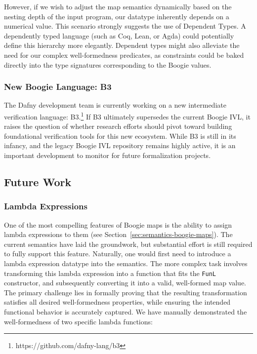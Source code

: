 \documentclass[11pt]{article}
\begin{document}
However, if we wish to adjust the map semantics dynamically based on the nesting depth of the input program,
our datatype inherently depends on a numerical value.
This scenario strongly suggests the use of Dependent Types. %
A dependently typed language (such as Coq, Lean, or Agda) could potentially define this hierarchy more elegantly.
Dependent types might also alleviate the need for our complex well-formedness predicates,
as constraints could be baked directly into the type signatures corresponding to the Boogie values.



\subsubsection{New Boogie Language: B3}

The Dafny development team is currently working on a new intermediate verification language: B3.\footnote{https://github.com/dafny-lang/b3}
If B3 ultimately supersedes the current Boogie IVL,
it raises the question of whether research efforts should pivot toward building foundational verification tools for this new ecosystem.
While B3 is still in its infancy, and the legacy Boogie IVL repository remains highly active,
it is an important development to monitor for future formalization projects.


\subsection{Future Work}

\subsubsection{Lambda Expressions}

One of the most compelling features of Boogie maps is the ability to assign lambda expressions to them (see Section~\ref{sec:semantics-boogie-maps}).
The current semantics have laid the groundwork, but substantial effort is still required to fully support this feature.
Naturally, one would first need to introduce a lambda expression datatype into the semantics.
The more complex task involves transforming this lambda expression into a function that fits the \texttt{FunL} constructor,
and subsequently converting it into a valid, well-formed map value.
The primary challenge lies in formally proving that the resulting transformation satisfies all desired well-formedness properties,
while ensuring the intended functional behavior is accurately captured.
We have manually demonstrated the well-formedness of two specific lambda functions:
\end{document}
